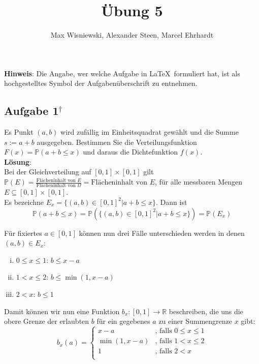 \documentclass[11pt,a4paper,ngerman]{article}
\date{}
\title{Übung 5}
\author{Max Wisniewski\maxw, Alexander Steen\alex, Marcel Ehrhardt\marcel}
\newcommand{\set}[1]{ \{ #1 \}}
\newcommand{\Prob}{\mathbb{P}}
\newcommand{\alex}{$^\dagger$}
\begin{document}

\renewcommand{\figurename}{Figure}

\maketitle
\thispagestyle{fancy}

\begin{center}
\textbf{Hinweis}: Die Angabe, wer welche Aufgabe in \LaTeX\ formuliert hat, ist als hochgestelltes Symbol der Aufgabenüberschrift zu entnehmen.
\end{center}


\subsection*{Aufgabe 1\alex}
Es Punkt $(a,b)$ wird zufällig im Einheitsquadrat gewählt und die Summe $s := a + b$ ausgegeben.
Bestimmen Sie die Verteilungsfunktion $F(x) = \Prob(a + b \leq x)$ und daraus die Dichtefunktion $f(x)$. \\

\textbf{Lösung}: \\
Bei der Gleichverteilung auf $[0,1] \times [0,1]$ gilt
$\Prob(E) = \frac{\text{Flächeninhalt von }E}{\text{Flächeninhalt von }\Omega} = \text{Flächeninhalt von }E$,
für alle messbaren Mengen $E \subseteq [0,1] \times [0,1]$. \\
Es bezeichne $E_x = \set{(a,b) \in [0,1]^2 | a+b \leq x}$.
Dann ist 
\begin{equation*}
\Prob(a+b \leq x) = \Prob(\set{(a,b) \in [0,1]^2 | a+b \leq x}) = \Prob(E_x)
\end{equation*}

Für fixiertes $a \in [0,1]$ können nun drei Fälle unterschieden werden in denen $(a,b) \in E_x$:
\begin{enumerate}[(i)]
	\item $0 \leq x \leq 1$: $b \leq x - a$
	\item $1 < x \leq 2$: $b \leq \min(1, x - a)$
	\item $2 < x$: $b \leq 1$
\end{enumerate}

Damit können wir nun eine Funktion $b_x: [0,1] \to \mathbb{R}$ beschreiben, die uns die obere Grenze der erlaubten $b$ für ein gegebenes $a$ zu einer Summengrenze $x$ gibt:
\begin{equation*}
b_x(a) = \begin{cases}
                  x - a & \text{, falls $0 \leq x \leq 1$} \\
                  \min(1,x - a) & \text{, falls $1 < x \leq 2$} \\
                  1 & \text{, falls $2 < x$} \\
               \end{cases}
\end{equation*}
\end{document}

